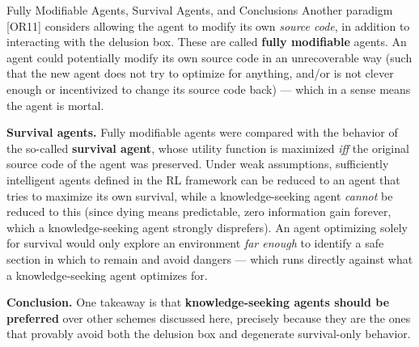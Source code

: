 \documentclass[aspectratio=169,10pt]{beamer}
\begin{document}
\begin{frame}{Fully Modifiable Agents, Survival Agents, and Conclusions}
  Another paradigm [OR11] considers allowing the agent to modify its own
  \emph{source code}, in addition to interacting with the delusion box.
  These are called \textbf{fully modifiable} agents. An agent could
  potentially modify its own source code in an unrecoverable way (such
  that the new agent does not try to optimize for anything, and/or is not
  clever enough or incentivized to change its source code back) --- which
  in a sense means the agent is mortal.

  \vspace{0.4em}
  \textbf{Survival agents.} Fully modifiable agents were compared with the
  behavior of the so-called \textbf{survival agent}, whose utility
  function is maximized \emph{iff} the original source code of the agent
  was preserved. Under weak assumptions, sufficiently intelligent agents
  defined in the RL framework can be reduced to an agent that tries to
  maximize its own survival, while a knowledge-seeking agent \emph{cannot}
  be reduced to this (since dying means predictable, zero information
  gain forever, which a knowledge-seeking agent strongly disprefers). An
  agent optimizing solely for survival would only explore an environment
  \emph{far enough} to identify a safe section in which to remain and
  avoid dangers --- which runs directly against what a knowledge-seeking
  agent optimizes for.

  \vspace{0.4em}
  \textbf{Conclusion.} One takeaway is that \textbf{knowledge-seeking
  agents should be preferred} over other schemes discussed here, precisely
  because they are the ones that provably avoid both the delusion box and
  degenerate survival-only behavior.
\end{frame}
\end{document}
